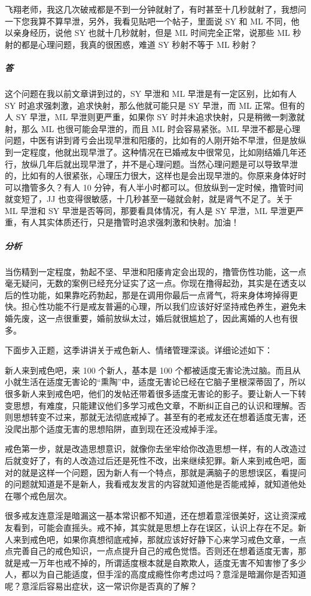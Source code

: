 \begin{case}
    飞翔老师，我这几次破戒都是不到一分钟就射了，有时甚至十几秒就射了，我想问一下您我算不算早泄，另外，我看见贴吧一个帖子，里面说 SY 和 ML 不同，他以亲身经历，说他 SY 也就十几秒就射，但是 ML 时间完全正常，说那些 ML 秒射的都是心理问题，我真的很困惑，难道 SY 秒射不等于 ML 秒射？
    \subparagraph{答} 这个问题在我以前文章讲到过的，SY 早泄和 ML 早泄是有一定区别，比如有人 SY 时追求强刺激，追求快射，那么他就可能只是 SY 早泄，而 ML 正常。但有的人 SY 早泄，ML 早泄则更严重，如果你 SY 时并未追求快射，只是稍微一刺激就射，那么 ML 也很可能会早泄的，而且 ML 时会容易紧张。ML 早泄不都是心理问题，中医有讲到肾亏会出现早泄和阳痿的，比如有的人刚开始不早泄，但是放纵到一定程度，他就出现早泄了。这种情况在已婚戒友中很常见，比如刚结婚几年还行，放纵几年后就出现早泄了，并不是心理问题。当然心理问题是可以导致早泄的，比如有的人很紧张，心理压力很大，这样也是会出现早泄的。你原来身体好时可以撸管多久？有人 10 分钟，有人半小时都可以。但放纵到一定时候，撸管时间就变短了，JJ 也变得很敏感，十几秒甚至一碰就会射，就是肾气不足了。关于 ML 早泄和 SY 早泄是否等同，那要看具体情况，有人是 SY 早泄，ML 早泄更严重，有人其实体质还行，只是撸管时追求强刺激和快射。加油！
    \subparagraph{分析} 当伤精到一定程度，勃起不坚、早泄和阳痿肯定会出现的，撸管伤性功能，这一点毫无疑问，无数的案例已经充分证实了这一点。你现在撸得起劲，其实是在透支以后的性功能，如果靠吃药勃起，那是在调用你最后一点肾气，将来身体垮掉得更快。担心性功能不行是戒友普遍的心理，所以我们应该好好坚持戒色养生，避免未婚先废，这一点很重要，婚前放纵太过，婚后就很尴尬了，因此离婚的人也有很多。
\end{case}

下面步入正题，这季讲讲关于戒色新人、情绪管理深谈。详细论述如下：

新人来到戒色吧，来 100 个新人，基本是 100 个都被适度无害论洗过脑。而且从小就生活在适度无害论的“熏陶”中，适度无害论已经在它脑子里根深蒂固了，所以很多新人来到戒色吧，他们的发帖还带着很多适度无害论的影子。要让新人一下转变思想，有难度，只能建议他们多学习戒色文章，不断纠正自己的认识和理解。否则思想转变不过来，那就无法彻底戒掉了。甚至有的老戒友还在想着适度无害，还没爬出那个适度无害的思想陷阱，直到现在还没戒掉手淫。

戒色第一步，就是改造思想意识，就像你去坐牢给你改造思想一样，有的人改造过后就变好了，有的人改造过后还是死性不改，出来继续犯罪。新人来到戒色吧，面对的就是这样一个问题，因为新人有一个特点，那就是满脑子的思想误区，看提问的问题就知道是不是新人，我看戒友发言的内容就知道他是否能戒掉，就知道他处在哪个戒色层次。

很多戒友连意淫是暗漏这一基本常识都不知道，还在想着意淫很美好，这让资深戒友看到，可能会直摇头。戒不掉，其实就是思想上存在误区，认识上存在不足。新人来到戒色吧，如果你真想彻底戒掉，那就应该好好静下心来学习戒色文章，一点点完善自己的戒色知识，一点点提升自己的戒色觉悟。否则还在想着适度无害，那就是戒一万年也戒不掉的，所谓适度根本就是自欺欺人，适度无害不知害惨了多少人，都以为自己能适度，但手淫的高度成瘾性你考虑过吗？意淫是暗漏你是否知道呢？意淫后容易出症状，这一常识你是否真的了解？

